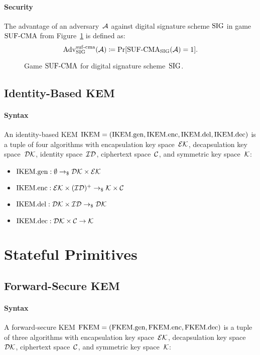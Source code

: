 \documentclass[a4paper,orivec]{llncs}
\begin{document}
\paragraph{Security}
The advantage of an adversary~$\mathcal{A}$ against digital signature scheme $\mathrm{SIG}$ in game ${\mathrm{SUF}\text{-}\mathrm{CMA}}$ from Figure~\ref{fig:sig:suf} is defined as:
\[
\mathrm{Adv}_{\mathrm{SIG}}^{\mathrm{suf}\text{-}\mathrm{cma}}(\mathcal{A})\coloneqq\Pr[{\mathrm{SUF}\text{-}\mathrm{CMA}}_{\mathrm{SIG}}(\mathcal{A})=1]\text{.}
\]

\begin{figure}[!ht]
    \centering
    \nicoresetlinenr%
    \fbox{%
        \scalebox{\codescalefactor}{%
        }%
    }
    \caption{%
        Game ${\mathrm{SUF}\text{-}\mathrm{CMA}}$ for digital signature scheme~$\mathrm{SIG}$.
    }
    \label{fig:sig:suf}
\end{figure}

\subsection{Identity-Based KEM}

\paragraph{Syntax}
An identity-based KEM $\mathrm{IKEM}=(\mathrm{IKEM}.\mathrm{gen},\mathrm{IKEM}.\mathrm{enc},\mathrm{IKEM}.\mathrm{del},\mathrm{IKEM}.\mathrm{dec})$ is a tuple of four algorithms with encapsulation key space~$\mathcal{EK}$, decapsulation key space~$\mathcal{DK}$, identity space~$\mathcal{ID}$, ciphertext space~$\mathcal{C}$, and symmetric key space~$\mathcal{K}$:

\begin{itemize}
    \item $\mathrm{IKEM}.\mathrm{gen}: \emptyset \to_\$ \mathcal{DK}\times\mathcal{EK}$
    \item $\mathrm{IKEM}.\mathrm{enc}: \mathcal{EK}\times(\mathcal{ID})^+ \to_\$ \mathcal{K}\times\mathcal{C}$
    \item $\mathrm{IKEM}.\mathrm{del}: \mathcal{DK}\times\mathcal{ID} \to_\$ \mathcal{DK}$
    \item $\mathrm{IKEM}.\mathrm{dec}: \mathcal{DK}\times\mathcal{C} \to \mathcal{K}$
\end{itemize}


\section{Stateful Primitives}

\subsection{Forward-Secure KEM}

\paragraph{Syntax}
A forward-secure KEM $\mathrm{FKEM}=(\mathrm{FKEM}.\mathrm{gen},\mathrm{FKEM}.\mathrm{enc},\mathrm{FKEM}.\mathrm{dec})$ is a tuple of three algorithms with encapsulation key space~$\mathcal{EK}$, decapsulation key space~$\mathcal{DK}$, ciphertext space~$\mathcal{C}$, and symmetric key space~$\mathcal{K}$:
\end{document}
